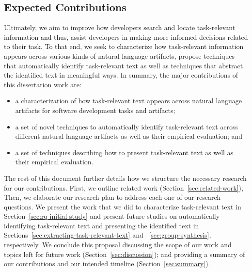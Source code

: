 \subsection{Expected Contributions}


Ultimately, we aim to improve how developers search and locate task-relevant information and thus, assist developers in making more informed decisions related to their task.
To that end, we seek to characterize how task-relevant information appears across various kinds of natural language artifacts,
propose techniques that automatically identify task-relevant text as well as techniques that abstract the identified text in meaningful ways.
In summary, the major contributions of this dissertation work are:

\begin{itemize}
    \item a characterization of how task-relevant text appears across natural language artifacts for software development tasks and artifacts;

    \item a set of novel techniques to automatically identify task-relevant text across different natural language artifacts as well as their empirical evaluation; and

    \item a set of techniques describing how to present task-relevant text as well as their empirical evaluation.
\end{itemize}


The rest of this document further details how we structure the necessary research for our contributions.
First, we outline  related work (Section~\ref{sec:related-work}),
Then, we elaborate our research plan to address each one of our research questions.
We present the work that we did to characterize task-relevant text in Section~\ref{sec:rq-initial-study}
and present future studies on automatically identifying task-relevant text and presenting the identified
text  in Sections~\ref{sec:extracting-task-relevant-text} and ~\ref{sec:group-synthesis}, respectively.
We conclude this proposal discussing the scope of our work and topics left for future work (Section~\ref{sec:discussion}); and providing
 a summary of our contributions and our intended timeline (Section~\ref{sec:summary}).






